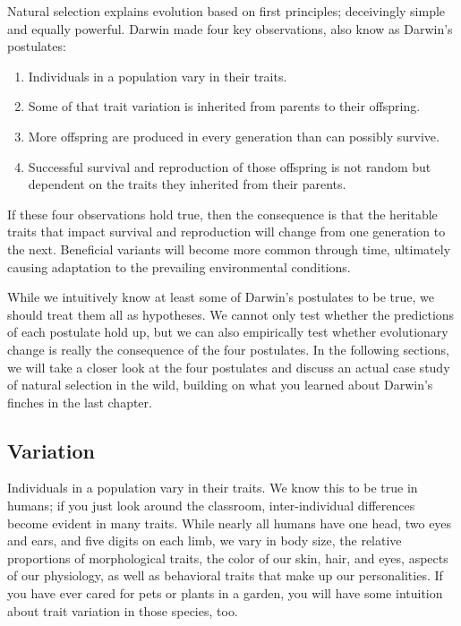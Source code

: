 \documentclass[
]{book}
\begin{document}
Natural selection explains evolution based on first principles; deceivingly simple and equally powerful. Darwin made four key observations, also know as Darwin's postulates:

\begin{enumerate}
\def\labelenumi{\arabic{enumi}.}
\item
  Individuals in a population vary in their traits.
\item
  Some of that trait variation is inherited from parents to their offspring.
\item
  More offspring are produced in every generation than can possibly survive.
\item
  Successful survival and reproduction of those offspring is not random but dependent on the traits they inherited from their parents.
\end{enumerate}

If these four observations hold true, then the consequence is that the heritable traits that impact survival and reproduction will change from one generation to the next. Beneficial variants will become more common through time, ultimately causing adaptation to the prevailing environmental conditions.

While we intuitively know at least some of Darwin's postulates to be true, we should treat them all as hypotheses. We cannot only test whether the predictions of each postulate hold up, but we can also empirically test whether evolutionary change is really the consequence of the four postulates. In the following sections, we will take a closer look at the four postulates and discuss an actual case study of natural selection in the wild, building on what you learned about Darwin's finches in the last chapter.

\hypertarget{variation}{%
\subsection{Variation}\label{variation}}

Individuals in a population vary in their traits. We know this to be true in humans; if you just look around the classroom, inter-individual differences become evident in many traits. While nearly all humans have one head, two eyes and ears, and five digits on each limb, we vary in body size, the relative proportions of morphological traits, the color of our skin, hair, and eyes, aspects of our physiology, as well as behavioral traits that make up our personalities. If you have ever cared for pets or plants in a garden, you will have some intuition about trait variation in those species, too.
\end{document}
